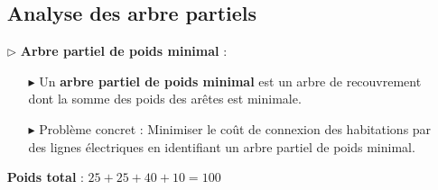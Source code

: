 \documentclass{report}
\begin{document}
\begin{multicols*}{2}
\begin{itemize}
    \subsection{Analyse des arbre partiels}
    \item[$\rhd$] \textbf{Arbre partiel de poids minimal} :
    \begin{itemize}
        \item [$\blacktriangleright$ ]  Un \textbf{arbre partiel de poids minimal} est un arbre de recouvrement dont la somme des poids des arêtes est minimale.
        \item [$\blacktriangleright$ ] Problème concret : Minimiser le coût de connexion des habitations par des lignes électriques en identifiant un arbre partiel de poids minimal.
    \end{itemize}

                \begin{center}
                \end{center}
                \begin{center}
                \textbf{Poids total}   : $25 + 25 + 40 + 10 = 100$
                \end{center}

\end{itemize}

\end{multicols*}
\end{document}

